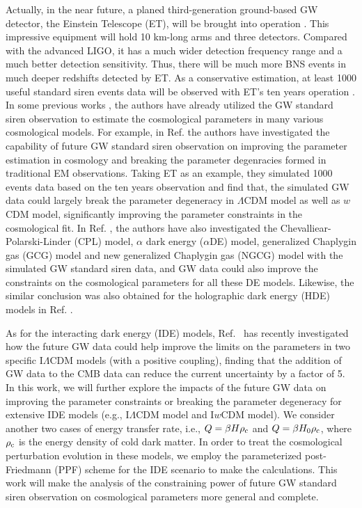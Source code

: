 \documentclass[aps,prd,nofootinbib,amsmath,amssymb,superscriptaddress,twocolumn,10pt]{revtex4}%
\begin{document}
Actually, in the near future, a planed third-generation ground-based GW detector, the Einstein Telescope (ET), will be brought into operation \cite{ET}. This impressive equipment will hold 10 km-long arms and three detectors. Compared with the advanced LIGO, it has a much wider detection frequency range and a much better detection sensitivity. Thus, there will be much more BNS events in much deeper redshifts detected by ET. As a conservative estimation, at least 1000 useful standard siren events data will be observed with ET's ten years operation \cite{Zhang:2018byx}.
In some previous works \cite{Zhao:2018gwk,Du:2018tia,Zhang:2018byx,Zhang:2019ple,Yang:2019bpr,Yang:2019vni,Bachega:2019fki,Zhang:2019loq,Zhang:2019ylr,Chang:2019xcb,He:2019dhl}, the authors have already utilized the GW standard siren observation to estimate the cosmological parameters in many various cosmological models. For example, in Ref. \cite{Zhang:2018byx} the authors have investigated the capability of future GW standard siren observation on improving the parameter estimation in cosmology and breaking the parameter degenracies formed in traditional EM observations. Taking ET as an example, they simulated 1000 events data based on the ten years observation and find that, the simulated GW data could largely break the parameter degeneracy in $\Lambda$CDM model as well as $w$CDM model, significantly improving the parameter constraints in the cosmological fit. In Ref. \cite{Zhang:2019loq}, the authors have also investigated the Chevalliear-Polarski-Linder (CPL) model, $\alpha$ dark energy ($\alpha$DE) model, generalized Chaplygin gas (GCG) model and new generalized Chaplygin gas (NGCG) model with the simulated GW standard siren data, and GW data could also improve the constraints on the cosmological parameters for all these DE models. Likewise, the similar conclusion was also obtained for the holographic dark energy (HDE) models in Ref. \cite{Zhang:2019ple}. 

As for the interacting dark energy (IDE) models, Ref.~\cite{Yang:2019vni} has recently investigated how the future GW data could help improve the limits on the parameters in two specific I$\Lambda$CDM models (with a positive coupling), finding that the addition of GW data to the CMB data can reduce the current uncertainty by a factor of 5. 
In this work, we will further explore the impacts of the future GW data on improving the parameter constraints or breaking the parameter degeneracy for extensive IDE models (e.g., I$\Lambda$CDM model and I$w$CDM model).
We consider another two cases of energy transfer rate, i.e., $Q=\beta H \rho_{\rm c}$ and $Q=\beta H_{0} \rho_{\rm c}$, where $\rho_{\rm c}$ is the energy density of cold dark matter. In order to treat the cosmological perturbation evolution in these models, we employ the parameterized post-Friedmann (PPF) scheme for the IDE scenario \cite{Li:2014eha} to make the calculations. This work will make the analysis of the constraining power of future GW standard siren observation on cosmological parameters more general and complete.
\end{document}
